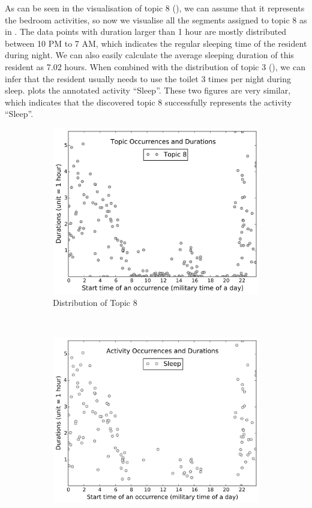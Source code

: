 \documentclass{article}
\begin{document}
As can be seen in the visualisation of topic 8 (), we can assume that it represents the bedroom activities, so now we visualise all the segments assigned to topic 8 as in . The data points with duration larger than 1 hour are mostly distributed between 10 PM to 7 AM, which indicates the regular sleeping time of the resident during night. We can also easily calculate the average sleeping duration of this resident as 7.02 hours. When combined with the distribution of topic 3 (), we can infer that the resident usually needs to use the toilet 3 times per night during sleep.  plots the annotated activity ``Sleep''. These two figures are very similar, which indicates that the discovered topic 8 successfully represents the activity ``Sleep''. 
%
 \begin{figure}[!t]
 \centering
\begin{subfigure}{0.49\linewidth}
    \includegraphics[width=\linewidth]{figures/adl_tm/Topic_time_stat_sleep_bw}
    \caption{Distribution of Topic 8}
    \label{fig:vissleep-a}
\end{subfigure} \
\begin{subfigure}{0.49\linewidth}
    \includegraphics[width=\linewidth]{figures/adl_tm/Activity_time_stat_sleep_bw}

\end{subfigure}
\end{figure}
\end{document}
